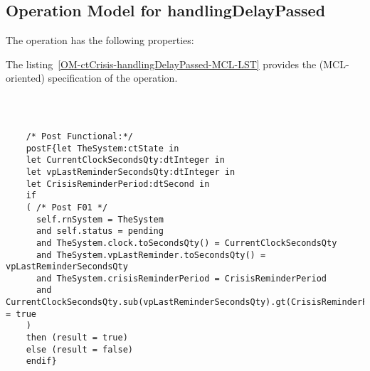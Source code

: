 \subsection{Operation Model for handlingDelayPassed}

\label{OM-handlingDelayPassed}


The  operation has the following properties:

	\begin{operationmodel}



		


	\end{operationmodel}



	\vspace{1cm}
	The listing~\ref{OM-ctCrisis-handlingDelayPassed-MCL-LST} provides the \msrmessir (MCL-oriented) specification of the operation.
	
	\scriptsize
	\vspace{0.5cm}
	\begin{lstlisting}[style=MessirStyle,firstnumber=auto,captionpos=b,caption={\msrmessir (MCL-oriented) specification of the operation \emph{handlingDelayPassed}.},label=OM-ctCrisis-handlingDelayPassed-MCL-LST]

	
	
	/* Post Functional:*/ 
	postF{let TheSystem:ctState in
	let CurrentClockSecondsQty:dtInteger in
	let vpLastReminderSecondsQty:dtInteger in
	let CrisisReminderPeriod:dtSecond in
	if 
	( /* Post F01 */
	  self.rnSystem = TheSystem
	  and self.status = pending
	  and TheSystem.clock.toSecondsQty() = CurrentClockSecondsQty
	  and TheSystem.vpLastReminder.toSecondsQty() = vpLastReminderSecondsQty
	  and TheSystem.crisisReminderPeriod = CrisisReminderPeriod
	  and CurrentClockSecondsQty.sub(vpLastReminderSecondsQty).gt(CrisisReminderPeriod) = true
	)
	then (result = true)
	else (result = false)
	endif}
	
	
	\end{lstlisting}
	\normalsize 
	
